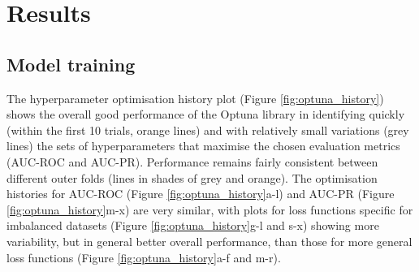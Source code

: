 \documentclass[nhess, manuscript]{copernicus}
\begin{document}
\section{Results}

\subsection{Model training}

The hyperparameter optimisation history plot (Figure \ref{fig:optuna_history}) shows the overall good performance of the Optuna library in identifying quickly (within the first 10 trials, orange lines) and with relatively small variations (grey lines) the sets of hyperparameters that maximise the chosen evaluation metrics (AUC-ROC and AUC-PR). Performance remains fairly consistent between different outer folds (lines in shades of grey and orange). The optimisation histories for AUC-ROC (Figure \ref{fig:optuna_history}a-l) and AUC-PR (Figure \ref{fig:optuna_history}m-x) are very similar, with plots for loss functions specific for imbalanced datasets (Figure \ref{fig:optuna_history}g-l and s-x) showing more variability, but in general better overall performance, than those for more general loss functions (Figure \ref{fig:optuna_history}a-f and m-r). 
\end{document}
